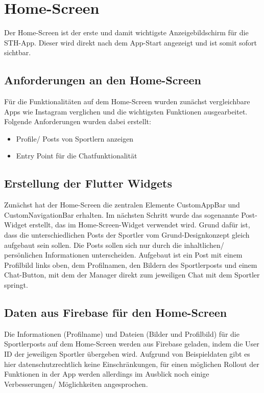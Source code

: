\chapter{Home-Screen}
Der Home-Screen ist der erste und damit wichtigste Anzeigebildschirm für die STH-App. 
Dieser wird direkt nach dem App-Start angezeigt und ist somit sofort sichtbar.
\section{Anforderungen an den Home-Screen}
Für die Funktionalitäten auf dem Home-Screen wurden zunächst vergleichbare Apps wie Instagram verglichen und die wichtigsten Funktionen ausgearbeitet.\newline
Folgende Anforderungen wurden dabei erstellt:
\begin{itemize}
    \item Profile/ Posts von Sportlern anzeigen
    \item Entry Point für die Chatfunktionalität
\end{itemize}

\section{Erstellung der Flutter Widgets}
Zunächst hat der Home-Screen die zentralen Elemente CustomAppBar und CustomNavigationBar erhalten.
Im nächsten Schritt wurde das sogenannte Post-Widget erstellt, das im Home-Screen-Widget verwendet wird.
Grund dafür ist, dass die unterschiedlichen Posts der Sportler vom Grund-Designkonzept gleich aufgebaut sein sollen. 
Die Posts sollen sich nur durch die inhaltlichen/ persönlichen Informationen unterscheiden.\newline
Aufgebaut ist ein Post mit einem Profilbild links oben, dem Profilnamen, den Bildern des Sportlerposts und einem Chat-Button, mit dem der Manager direkt zum jeweiligen Chat mit dem Sportler springt.

\section{Daten aus Firebase für den Home-Screen}
Die Informationen (Profilname) und Dateien (Bilder und Profilbild) für die Sportlerposts auf dem Home-Screen werden aus Firebase geladen, indem die User ID der jeweiligen Sportler übergeben wird.
Aufgrund von Beispieldaten gibt es hier datenschutzrechtlich keine Einschränkungen, für einen möglichen Rollout der Funktionen in der App werden allerdings im Ausblick noch einige Verbesserungen/ Möglichkeiten angesprochen.

